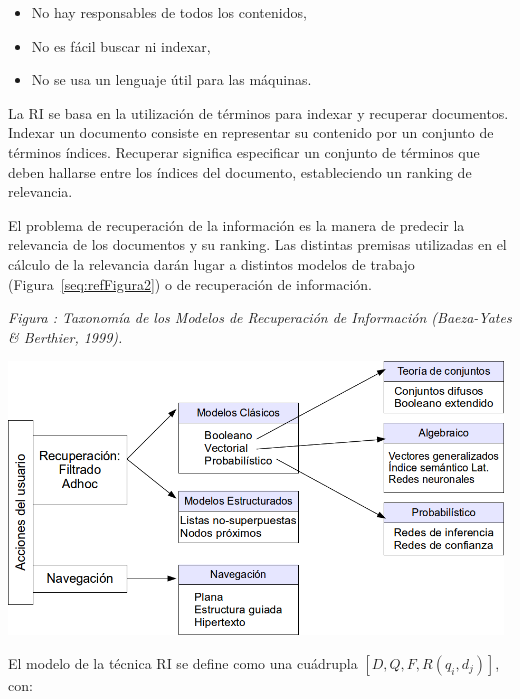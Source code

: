 \documentclass[letterpaper]{article}
\newcommand\liststyleWWviiiNumiv{%
\renewcommand\labelitemi{{\textbullet}}
\renewcommand\labelitemii{${\circ}$}
\renewcommand\labelitemiii{${\blacksquare}$}
\renewcommand\labelitemiv{{\textbullet}}
}
\newcounter{Figura}
\renewcommand\theFigura{\arabic{Figura}}
\begin{document}
\bigskip

\liststyleWWviiiNumiv
\begin{itemize}
\item {\sffamily
No hay responsables de todos los contenidos,}
\item {\sffamily
No es f\'acil buscar ni indexar,}
\item {\sffamily
No se usa un lenguaje \'util para las m\'aquinas.}
\end{itemize}

\bigskip

{\sffamily
La RI se basa en la utilizaci\'on de t\'erminos para indexar y recuperar
documentos. Indexar un documento consiste en representar su contenido
por un conjunto de t\'erminos \'indices. Recuperar significa
especificar un conjunto de t\'erminos que deben hallarse entre los
\'indices del documento, estableciendo un ranking de relevancia.}


\bigskip

{\sffamily
El problema de recuperaci\'on de la informaci\'on es la manera de
predecir la relevancia de los documentos y su ranking. Las distintas
premisas utilizadas en el c\'alculo de la relevancia dar\'an lugar a
distintos modelos de trabajo (Figura~\ref{seq:refFigura2}) o de
recuperaci\'on de informaci\'on.}



\begin{center}
\begin{minipage}{13.132cm}
{\centering{}\itshape
Figura {\theFigura\label{seq:refFigura2}}:
Taxonom\'ia de los Modelos de Recuperaci\'on de Informaci\'on
(Baeza-Yates \& Berthier, 1999).
\par}
\includegraphics[width=13.132cm,height=7.25cm]{Capitulo2-img6.png}\end{minipage}
\end{center}
{\sffamily
El modelo de la t\'ecnica RI se define como una cu\'adrupla 
$[D,Q,F,R(q_{i},d_{j})]$, con:}
\end{document}
